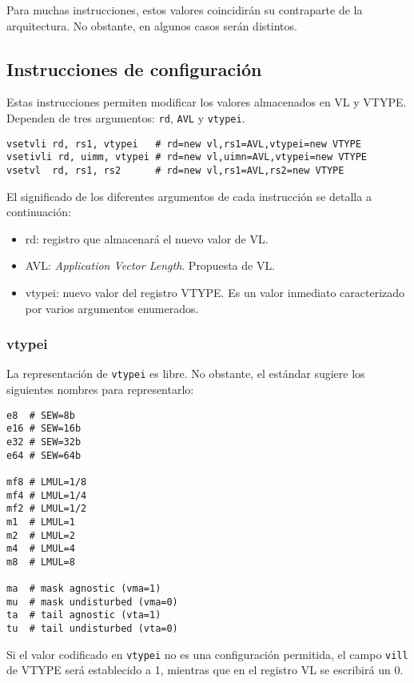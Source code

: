 Para muchas instrucciones, estos valores coincidirán su contraparte de la arquitectura. No obstante, en algunos casos serán distintos.

\subsection{Instrucciones de configuración}\label{conf-instructions}
Estas instrucciones permiten modificar los valores almacenados en VL y VTYPE. Dependen de tres argumentos: \texttt{rd}, \texttt{AVL} y \texttt{vtypei}.

\begin{lstlisting}
vsetvli rd, rs1, vtypei   # rd=new vl,rs1=AVL,vtypei=new VTYPE
vsetivli rd, uimm, vtypei # rd=new vl,uimn=AVL,vtypei=new VTYPE
vsetvl  rd, rs1, rs2      # rd=new vl,rs1=AVL,rs2=new VTYPE
\end{lstlisting}

El significado de los diferentes argumentos de cada instrucción se detalla a continuación:
\begin{itemize}
    \item rd: registro que almacenará el nuevo valor de VL.
    \item AVL: \textit{Application Vector Length}. Propuesta de VL.
    \item vtypei: nuevo valor del registro VTYPE. Es un valor inmediato caracterizado por varios argumentos enumerados.
\end{itemize}

\subsubsection{vtypei}
La representación de \texttt{vtypei} es libre. No obstante, el estándar sugiere
los siguientes nombres para representarlo:

\begin{lstlisting}
e8  # SEW=8b   
e16 # SEW=16b
e32 # SEW=32b
e64 # SEW=64b

mf8 # LMUL=1/8
mf4 # LMUL=1/4
mf2 # LMUL=1/2
m1  # LMUL=1
m2  # LMUL=2
m4  # LMUL=4
m8  # LMUL=8

ma  # mask agnostic (vma=1)
mu  # mask undisturbed (vma=0)
ta  # tail agnostic (vta=1)
tu  # tail undisturbed (vta=0)
\end{lstlisting}

Si el valor codificado en \texttt{vtypei} no es una configuración permitida, el
campo \texttt{vill} de VTYPE será establecido a 1, mientras que en el registro
VL se escribirá un 0.

